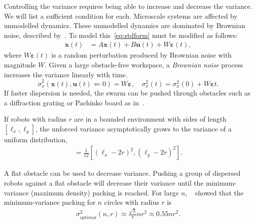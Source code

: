Controlling the variance requires being able to increase and decrease the variance.  We will list a sufficient condition for each. 
Microscale systems are affected by unmodelled dynamics. 
These unmodelled dynamics are dominated by Brownian noise, described by~\cite{einstein1956investigations}. 
To model this~\eqref{eq:stdform} must be modified as follows:
\begin{align}
\dot{\mathbf{x}}(t)  &=  A \mathbf{x}(t) + B \mathbf{u}(t) + W \bm{\varepsilon}(t),
\end{align}
where $W\bm{\varepsilon}(t)$ is a random perturbation produced by Brownian noise with magnitude $W$. Given a large obstacle-free workspace, a \emph{Brownian noise} process increases the variance linearly with time.
\begin{equation}
\dot{\sigma}_x^2(\mathbf{x}(t), \mathbf{u}(t) \Leftarrow 0)  = W \bm{\varepsilon},
\quad \sigma_x^2(t)  = \sigma_x^2(0) + W \bm{\varepsilon} t.
\end{equation}
 If faster dispersion is needed, the swarm can be pushed through obstacles such as a diffraction grating or Pachinko board as in~\cite{Becker2013b}. 

If robots with radius $r$ are in a bounded environment with sides of length $[\ell_x, \ell_y]$, the unforced variance asymptotically grows to the variance of a uniform distribution,
\begin{align}
[\sigma_x^2,\sigma_y^2] = \frac{1}{12}[ (\ell_x - 2 r)^2,(\ell_y - 2 r)^2].\label{eq:VarianceUniformDistribution}
\end{align}

 A flat obstacle can be used to decrease variance. Pushing a group of dispersed robots against a flat obstacle will decrease their variance until the minimum-variance (maximum density) packing  is reached. For large $n$, ~\cite{graham1990penny} showed that the minimum-variance packing  for $n$ circles with radius $r$ is 
 \begin{align} \label{eq:optimalvar}
 \sigma^2_{optimal}(n,r) \approx   \frac{\sqrt{3}}{\pi} n r^2\approx 0.55 n r^2.
 \end{align} 

